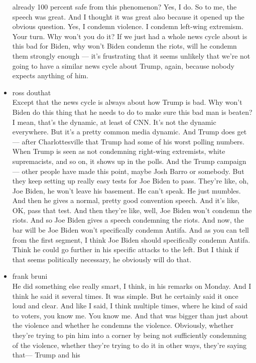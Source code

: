 \begin{itemize}
  already 100 percent safe from this phenomenon? Yes, I do. So to me,
  the speech was great. And I thought it was great also because it
  opened up the obvious question. Yes, I condemn violence. I condemn
  left-wing extremism. Your turn. Why won't you do it? If we just had a
  whole news cycle about is this bad for Biden, why won't Biden condemn
  the riots, will he condemn them strongly enough --- it's frustrating
  that it seems unlikely that we're not going to have a similar news
  cycle about Trump, again, because nobody expects anything of him.
\item
  ross douthat\\
  Except that the news cycle is always about how Trump is bad. Why won't
  Biden do this thing that he needs to do to make sure this bad man is
  beaten? I mean, that's the dynamic, at least of CNN. It's not the
  dynamic everywhere. But it's a pretty common media dynamic. And Trump
  does get--- after Charlottesville that Trump had some of his worst
  polling numbers. When Trump is seen as not condemning right-wing
  extremists, white supremacists, and so on, it shows up in the polls.
  And the Trump campaign --- other people have made this point, maybe
  Josh Barro or somebody. But they keep setting up really easy tests for
  Joe Biden to pass. They're like, oh, Joe Biden, he won't leave his
  basement. He can't speak. He just mumbles. And then he gives a normal,
  pretty good convention speech. And it's like, OK, pass that test. And
  then they're like, well, Joe Biden won't condemn the riots. And so Joe
  Biden gives a speech condemning the riots. And now, the bar will be
  Joe Biden won't specifically condemn Antifa. And as you can tell from
  the first segment, I think Joe Biden should specifically condemn
  Antifa. Think he could go further in his specific attacks to the left.
  But I think if that seems politically necessary, he obviously will do
  that.
\item
  frank bruni\\
  He did something else really smart, I think, in his remarks on Monday.
  And I think he said it several times. It was simple. But he certainly
  said it once loud and clear. And like I said, I think multiple times,
  where he kind of said to voters, you know me. You know me. And that
  was bigger than just about the violence and whether he condemns the
  violence. Obviously, whether they're trying to pin him into a corner
  by being not sufficiently condemning of the violence, whether they're
  trying to do it in other ways, they're saying that--- Trump and his

\end{itemize}
